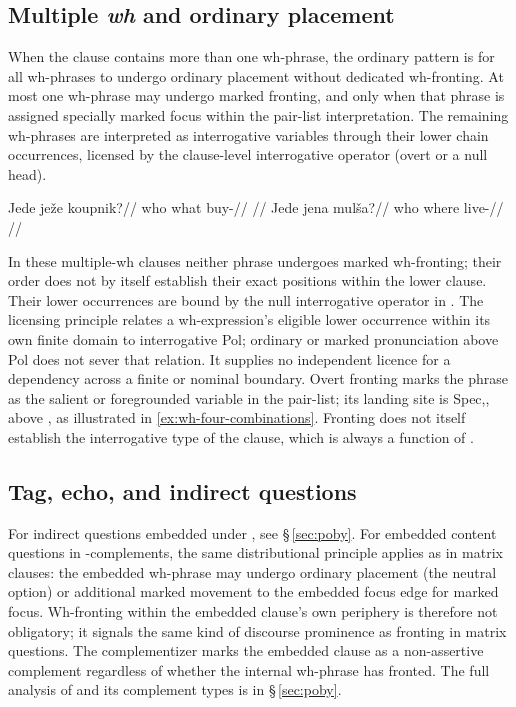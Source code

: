 \subsection{Multiple \textit{wh} and ordinary placement}
\label{sec:th-multiple-wh}

When the clause contains more than one wh-phrase, the ordinary pattern is for
all wh-phrases to undergo ordinary placement without dedicated wh-fronting.
At most one wh-phrase may undergo marked fronting,
and only when that phrase is assigned specially marked focus
within the pair-list interpretation. The remaining wh-phrases are interpreted as
interrogative variables through their lower chain occurrences, licensed by the clause-level
interrogative operator (overt  or a null  head).

\pex
\a
\begingl
\gla Jede ježe koupnik?//
\glb who what buy-\Pf{}//
\glft {}//
\endgl
\a
\begingl
\gla Jede jena mulša?//
\glb who where live-\Cont{}//
\glft {}//
\endgl
\xe

\noindent In these multiple-wh clauses neither phrase undergoes marked
wh-fronting; their order does not by itself establish their exact positions
within the lower clause. Their lower occurrences are bound by the null interrogative
operator in . The licensing principle relates a wh-expression's eligible lower occurrence
within its own finite domain to interrogative Pol; ordinary or marked
pronunciation above Pol does not sever that relation. It supplies no
independent licence for a dependency across a finite or nominal boundary.
Overt fronting marks the phrase as the salient or
foregrounded variable in the pair-list; its landing site is Spec,, above , as
illustrated in \ref{ex:wh-four-combinations}. Fronting does not itself establish the
interrogative type of the clause, which is always a function of .

\subsection{Tag, echo, and indirect questions}
\label{sec:th-tag-echo}

For indirect questions embedded under , see §\,\ref{sec:poby}. For
embedded content questions in -complements, the same distributional
principle applies as in matrix clauses: the embedded wh-phrase may undergo ordinary placement
(the neutral option) or additional marked movement to the embedded focus edge
for marked focus. Wh-fronting within the embedded clause's own periphery is
therefore not obligatory; it signals the same kind of discourse prominence as
fronting in matrix questions. The  complementizer marks the embedded
clause as a non-assertive complement regardless of whether the internal
wh-phrase has fronted. The full analysis of  and its complement types
is in §\,\ref{sec:poby}.

